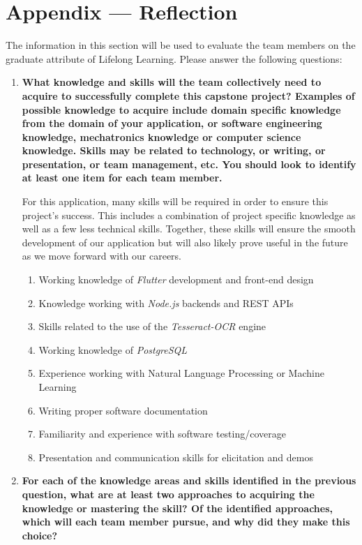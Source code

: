 \documentclass[12pt]{article}
\begin{document}
\newpage{}
\section*{Appendix --- Reflection}

The information in this section will be used to evaluate the team members on the
graduate attribute of Lifelong Learning.  Please answer the following questions:

\begin{enumerate}
  \item \textbf{What knowledge and skills will the team collectively need to acquire to
  successfully complete this capstone project?  Examples of possible knowledge
  to acquire include domain specific knowledge from the domain of your
  application, or software engineering knowledge, mechatronics knowledge or
  computer science knowledge.  Skills may be related to technology, or writing,
  or presentation, or team management, etc.  You should look to identify at
  least one item for each team member.}

  For this application, many skills will be required in order to ensure this
  project's success. This includes a combination of project specific knowledge
  as well as a few less technical skills. Together, these skills will ensure the
  smooth development of our application but will also likely prove useful in the future
  as we move forward with our careers.
  \begin{enumerate}
    \item Working knowledge of \textit{Flutter} development and front-end design
    \item Knowledge working with \textit{Node.js} backends and REST APIs
    \item Skills related to the use of the \textit{Tesseract-OCR} engine
    \item Working knowledge of \textit{PostgreSQL}
    \item Experience working with Natural Language Processing or Machine Learning
    \item Writing proper software documentation
    \item Familiarity and experience with software testing/coverage
    \item Presentation and communication skills for elicitation and demos
  \end{enumerate}  

  \item \textbf{For each of the knowledge areas and skills identified in the previous
  question, what are at least two approaches to acquiring the knowledge or
  mastering the skill?  Of the identified approaches, which will each team
  member pursue, and why did they make this choice?}


\end{enumerate}
\end{document}
